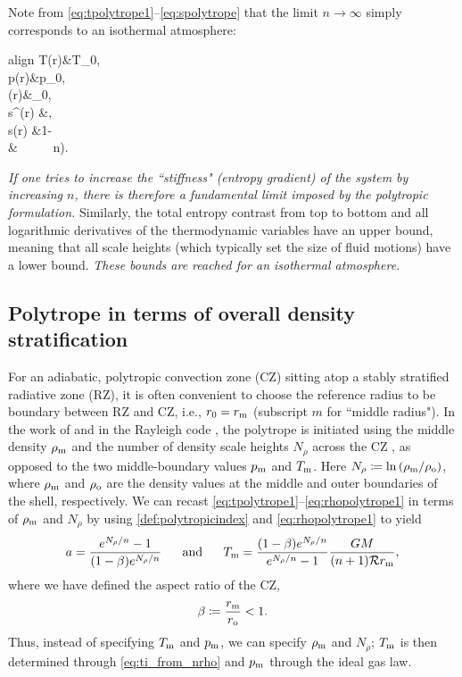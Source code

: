 \documentclass[12pt]{article} %
\newcommand{\rrm}{r_{\rm{m}}}
\begin{document}
Note from \eqref{eq:tpolytrope1}--\eqref{eq:spolytrope} that the limit $n\rightarrow\infty$ simply corresponds to an isothermal atmosphere:
	\begin{empheq}[box=\fbox]{align}\label{eq:limitninfty}
T(r)&\rightarrow T_0, \\
p(r)&\rightarrow p_0,\\
\rho(r)&\rightarrow \rho_0,\\
s^\prime(r) &\rightarrow {},\\
 \andd s(r) &\rightarrow {}\bigg{(}1-\bigg{)}\\ 
 &\ \ \ \ \  n\rightarrow\infty). \nonumber
\end{empheq}
\textit{If one tries to increase the ``stiffness" (entropy gradient) of the system by increasing $n$, there is therefore a fundamental limit imposed by the polytropic formulation.}
Similarly, the total entropy contrast from top to bottom and all logarithmic derivatives of the thermodynamic variables have an upper bound, meaning that all scale heights (which typically set the size of fluid motions) have a lower bound. \textit{These bounds are reached for an isothermal atmosphere.}

\subsection{Polytrope in terms of overall density stratification}
For an adiabatic, polytropic convection zone (CZ) sitting atop a stably stratified radiative zone (RZ), it is often convenient to choose the reference radius to be boundary between RZ and CZ, i.e., $r_0=\rrm$ (subscript $m$ for ``middle radius"). In the work of \citet{Jones11} and in the Rayleigh code \citep{Featherstone18}, the polytrope is initiated using the middle density $\rho_{\rm{m}}$ and the number of density scale heights $N_\rho$ across the CZ , as opposed to the two middle-boundary values $p_{\rm{m}}$ and $T_{\rm{m}}$. Here $N_\rho\coloneqq\ln{(\rho_{\rm{m}}/\rho_{\rm{o}})}$, where $\rho_{\rm{m}}$ and $\rho_{\rm{o}}$ are the density values at the middle and outer boundaries of the shell, respectively. We can recast \eqref{eq:tpolytrope1}--\eqref{eq:rhopolytrope1} in terms of $\rho_{\rm{m}}$ and $N_\rho$ by using \eqref{def:polytropicindex} and \eqref{eq:rhopolytrope1} to yield
\begin{align}
a = \frac{e^{N_\rho/n} - 1 }{(1 - \beta)e^{N_\rho/n}} \five \andd T_{\rm{m}} = \frac{(1 - \beta)e^{N_\rho/n}} {e^{N_\rho/n} - 1 }\frac{GM}{(n+1)\mathcal{R} \rrm},
\label{eq:ti_from_nrho}
\end{align}
where we have defined the aspect ratio of the CZ,
\begin{align}
\beta\coloneqq \frac{\rrm}{r_{\rm{o}}} < 1.
\label{def:beta}
\end{align}
Thus, instead of specifying $T_{\rm{m}}$ and $p_{\rm{m}}$, we can specify $\rho_{\rm{m}}$ and $N_\rho$; $T_{\rm{m}}$ is then determined through \eqref{eq:ti_from_nrho} and $p_{\rm{m}}$ through the ideal gas law. 
\end{document}
